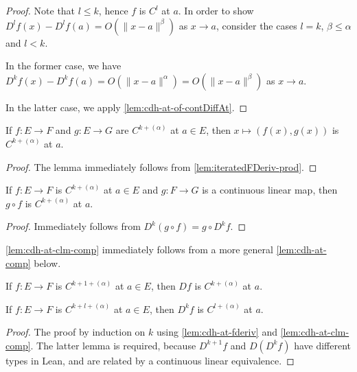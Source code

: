 \begin{proof}
  \leanok%
  Note that \(l\le k\), hence \(f\) is \(C^{l}\) at \(a\).
  In order to show \(D^{l}f(x) - D^{l}f(a) = O(\|x - a\|^{\beta})\) as \(x\to a\),
  consider the cases \(l = k\), \(\beta \le \alpha\) and \(l < k\).

  In the former case, we have \(D^{k}f(x) - D^{k}f(a) = O\left(\|x - a\|^{\alpha}\right)=O\left(\|x - a\|^{\beta}\right)\) as \(x\to a\).

  In the latter case, we apply \autoref{lem:cdh-at-of-contDiffAt}.
\end{proof}

\begin{lemma}%
  \label{lem:cdh-at-prodMk}
  If \(f \colon E \to F\) and \(g \colon E \to G\) are \(C^{k+(\alpha)}\) at \(a \in E\),
  then \(x \mapsto (f(x), g(x))\) is \(C^{k+(\alpha)}\) at \(a\).
\end{lemma}
\begin{proof}
  The lemma immediately follows from \autoref{lem:iteratedFDeriv-prod}.
\end{proof}

\begin{lemma}%
  \label{lem:cdh-at-clm-comp}
  If \(f \colon E \to F\) is \(C^{k+(\alpha)}\) at \(a \in E\)
  and \(g \colon F \to G\) is a continuous linear map,
  then \(g \circ f\) is \(C^{k+(\alpha)}\) at \(a\).
\end{lemma}

\begin{proof}
  Immediately follows from \(D^{k}(g \circ f) = g\circ D^{k}f\).
\end{proof}

\begin{remark}
  \autoref{lem:cdh-at-clm-comp} immediately follows from a more general \autoref{lem:cdh-at-comp} below.
\end{remark}

\begin{lemma}%
  \label{lem:cdh-at-fderiv}
  If \(f \colon E \to F\) is \(C^{k+1+(\alpha)}\) at \(a \in E\),
  then \(Df\) is \(C^{k+(\alpha)}\) at \(a\).
\end{lemma}

\begin{corollary}%
  \label{lem:cdh-at-iteratedFDeriv}
  If \(f \colon E \to F\) is \(C^{k+l+(\alpha)}\) at \(a \in E\),
  then \(D^{k}f\) is \(C^{l+(\alpha)}\) at \(a\).
\end{corollary}
\begin{proof}
  The proof by induction on \(k\) using \autoref{lem:cdh-at-fderiv} and \autoref{lem:cdh-at-clm-comp}.
  The latter lemma is required, because \(D^{k+1}f\) and \(D(D^{k} f)\) have different types in Lean,
  and are related by a continuous linear equivalence.
\end{proof}

